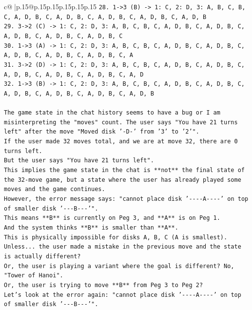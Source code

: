 \documentclass{article}
\begin{document}
{\begin{supertabular}{c@{$\;$}|p{.15\linewidth}@{}p{.15\linewidth}p{.15\linewidth}p{.15\linewidth}p{.15\linewidth}p{.15\linewidth}}
{{{\texttt{28. 1{-}>3 (B) {-}> 1: C, 2: D, 3: A, B, C, B, C, A, D, B, C, A, D, B, C, A, D, B, C, A, D, B, C, A, D, B} \\
\texttt{29. 3{-}>2 (C) {-}> 1: C, 2: D, 3: A, B, C, B, C, A, D, B, C, A, D, B, C, A, D, B, C, A, D, B, C, A, D, B, C} \\
\texttt{30. 1{-}>3 (A) {-}> 1: C, 2: D, 3: A, B, C, B, C, A, D, B, C, A, D, B, C, A, D, B, C, A, D, B, C, A, D, B, C, A} \\
\texttt{31. 3{-}>2 (D) {-}> 1: C, 2: D, 3: A, B, C, B, C, A, D, B, C, A, D, B, C, A, D, B, C, A, D, B, C, A, D, B, C, A, D} \\
\texttt{32. 1{-}>3 (B) {-}> 1: C, 2: D, 3: A, B, C, B, C, A, D, B, C, A, D, B, C, A, D, B, C, A, D, B, C, A, D, B, C, A, D, B} \\
\\ 
\texttt{The game state in the chat history seems to have a bug or I am misinterpreting the "moves" count. The user says "You have 21 turns left" after the move "Moved disk '{-}D{-}' from '3' to '2'".} \\
\texttt{If the user made 32 moves total, and we are at move 32, there are 0 turns left.} \\
\texttt{But the user says "You have 21 turns left".} \\
\texttt{This implies the game state in the chat is **not** the final state of the 32{-}move game, but a state where the user has already played some moves and the game continues.} \\
\texttt{However, the error message says: "cannot place disk '{-}{-}{-}{-}A{-}{-}{-}{-}' on top of smaller disk '{-}{-}{-}B{-}{-}{-}'".} \\
\texttt{This means **B** is currently on Peg 3, and **A** is on Peg 1.} \\
\texttt{And the system thinks **B** is smaller than **A**.} \\
\texttt{This is physically impossible for disks A, B, C (A is smallest).} \\
\texttt{Unless... the user made a mistake in the previous move and the state is actually different?} \\
\texttt{Or, the user is playing a variant where the goal is different? No, "Tower of Hanoi".} \\
\texttt{Or, the user is trying to move **B** from Peg 3 to Peg 2?} \\
\texttt{Let's look at the error again: "cannot place disk '{-}{-}{-}{-}A{-}{-}{-}{-}' on top of smaller disk '{-}{-}{-}B{-}{-}{-}'".} \\
}}}
\end{supertabular}}
\end{document}
